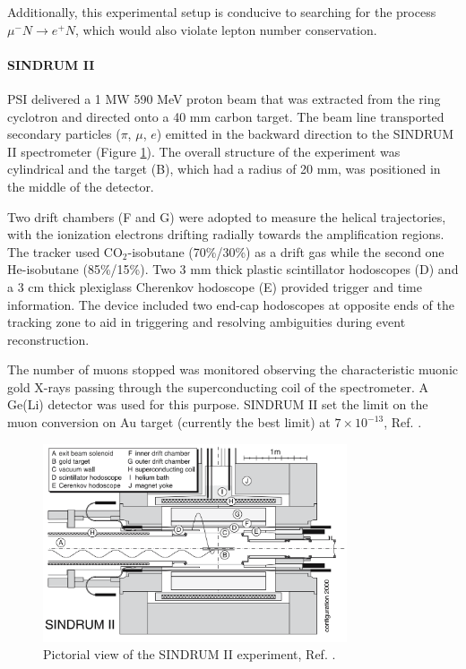 Additionally, this experimental setup is conducive to 
searching for the process $\mu^- N \rightarrow e^+ N$, which would also violate lepton number conservation.
\paragraph{SINDRUM II}
PSI delivered a 1 MW 590 MeV proton 
beam that was extracted from the ring
cyclotron and directed onto a 40 
mm carbon target. The beam line
transported secondary particles ($\pi$, $\mu$, $e$) 
emitted in the backward 
direction to the SINDRUM II spectrometer 
(Figure \ref{fig:sindrumii}).
The overall structure of the experiment
was cylindrical and the target (B), 
which had a radius of 20 mm, was positioned
in the middle of the detector.

Two drift chambers (F and G) were adopted to measure
the helical trajectories, with the 
ionization electrons drifting radially 
towards the amplification 
regions. The tracker used CO$_2$-isobutane 
(70\%/30\%) as a drift
gas while the second one He-isobutane 
(85\%/15\%). Two 3 mm thick plastic 
scintillator hodoscopes (D) and a 3 cm 
thick plexiglass Cherenkov hodoscope 
(E) provided trigger and time information. 
The device included two end-cap hodoscopes 
at opposite ends of the tracking zone to 
aid in triggering 
and resolving ambiguities during event reconstruction.

The number of muons stopped
was monitored observing the characteristic 
muonic gold X-rays passing through the
superconducting coil of the spectrometer. 
A Ge(Li) detector was used for this purpose.
SINDRUM II set the limit on the 
muon conversion on Au target 
(currently the best limit) at $7 \times 10^{-13}$, 
Ref. \cite{SINDRUMII:2006dvw}.

\begin{figure}[!h]
\centering
\includegraphics[width =0.8\textwidth]{figures/png/Screenshot_20240307_163120.png}
\caption[SINDRUM II experiment.]{Pictorial view of the SINDRUM II experiment, Ref. \cite{SINDRUMII:2006dvw}.}
\label{fig:sindrumii}
\end{figure}
